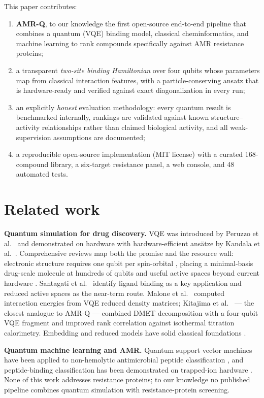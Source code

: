 \documentclass[10pt,twocolumn]{article}
\begin{document}
This paper contributes:
\begin{enumerate}\setlength\itemsep{1pt}
\item \textbf{AMR-Q}, to our knowledge the first open-source end-to-end pipeline that
combines a quantum (VQE) binding model, classical cheminformatics, and machine learning
to rank compounds specifically against AMR resistance proteins;
\item a transparent \emph{two-site binding Hamiltonian} over four qubits whose
parameters map from classical interaction features, with a particle-conserving
ansatz that is hardware-ready and verified against exact diagonalization in every run;
\item an explicitly \emph{honest} evaluation methodology: every quantum result is
benchmarked internally, rankings are validated against known structure--activity
relationships rather than claimed biological activity, and all weak-supervision
assumptions are documented;
\item a reproducible open-source implementation (MIT license) with a curated
168-compound library, a six-target resistance panel, a web console, and 48 automated
tests.
\end{enumerate}

\section{Related work}

\textbf{Quantum simulation for drug discovery.} VQE was introduced by Peruzzo et al.\
\cite{peruzzo2014} and demonstrated on hardware with hardware-efficient ans\"atze by
Kandala et al.\ \cite{kandala2017}. Comprehensive reviews map both the promise and the
resource wall: electronic structure requires one qubit per spin-orbital
\cite{cao2019}, placing a minimal-basis drug-scale molecule at hundreds of qubits and
useful active spaces beyond current hardware \cite{blunt2022}. Santagati et al.\
\cite{santagati2024} identify ligand binding as a key application and reduced active
spaces as the near-term route. Malone et al.\ \cite{malone2022} computed interaction
energies from VQE reduced density matrices; Kitajima et al.\ \cite{kitajima2026} ---
the closest analogue to AMR-Q --- combined DMET decomposition with a four-qubit VQE
fragment and improved rank correlation against isothermal titration calorimetry.
Embedding and reduced models have solid classical foundations \cite{wouters2016}.

\textbf{Quantum machine learning and AMR.} Quantum support vector machines have been
applied to non-hemolytic antimicrobial peptide classification \cite{zhuang2024}, and
peptide-binding classification has been demonstrated on trapped-ion hardware
\cite{london2024}. None of this work addresses resistance proteins; to our knowledge no
published pipeline combines quantum simulation with resistance-protein screening.
\end{document}
